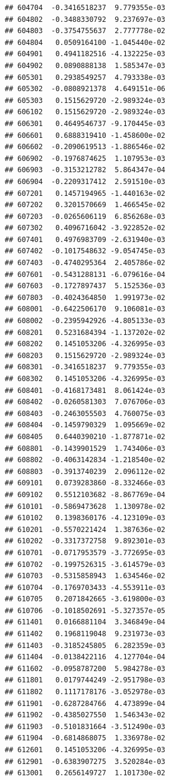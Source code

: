 \begin{frame}[fragile]
\begin{verbatim}
## 604704  -0.3416518237  9.779355e-03
## 604802  -0.3488330792  9.237697e-03
## 604803  -0.3754755637  2.777778e-02
## 604804   0.0509164100 -1.045440e-02
## 604901   0.4941182516 -4.132225e-03
## 604902   0.0890888138  1.585347e-03
## 605301   0.2938549257  4.793338e-03
## 605302  -0.0808921378  4.649151e-06
## 605303   0.1515629720 -2.989324e-03
## 606102   0.1515629720 -2.989324e-03
## 606301   0.4649546737 -9.170445e-03
## 606601   0.6888319410 -1.458600e-02
## 606602  -0.2090619513 -1.886546e-02
## 606902  -0.1976874625  1.107953e-03
## 606903  -0.3153212782  5.864347e-04
## 606904  -0.2209317412  2.591510e-03
## 607201   0.1457194965 -1.440163e-02
## 607202   0.3201570669  1.466545e-02
## 607203  -0.0265606119  6.856268e-03
## 607302   0.4096716042 -3.922852e-02
## 607401   0.4976983709 -2.631940e-03
## 607402  -0.1017548632 -9.054745e-03
## 607403  -0.4740295364  2.405786e-02
## 607601  -0.5431288131 -6.079616e-04
## 607603  -0.1727897437  5.152536e-03
## 607803  -0.4024364850  1.991973e-02
## 608001  -0.6422506170  9.106081e-03
## 608002  -0.2395942926 -4.805133e-03
## 608201   0.5231684394 -1.137202e-02
## 608202   0.1451053206 -4.326995e-03
## 608203   0.1515629720 -2.989324e-03
## 608301  -0.3416518237  9.779355e-03
## 608302   0.1451053206 -4.326995e-03
## 608401  -0.4168173481  8.061424e-03
## 608402  -0.0260581303  7.076706e-03
## 608403  -0.2463055503  4.760075e-03
## 608404  -0.1459790329  1.095669e-02
## 608405   0.6440390210 -1.877871e-02
## 608801  -0.1439901529  1.743406e-03
## 608802  -0.4063142834 -1.218540e-02
## 608803  -0.3913740239  2.096112e-02
## 609101   0.0739283860 -8.332466e-03
## 609102   0.5512103682 -8.867769e-04
## 610101  -0.5869473628  1.130978e-02
## 610102   0.1398360176 -4.123109e-03
## 610201  -0.5570221424  1.387636e-02
## 610202  -0.3317372758  9.892301e-03
## 610701  -0.0717953579 -3.772695e-03
## 610702  -0.1997526315 -3.614579e-03
## 610703  -0.5315858943  1.634546e-02
## 610704  -0.1769703433 -4.553911e-03
## 610705   0.2071842665 -3.619800e-03
## 610706  -0.1018502691 -5.327357e-05
## 611401   0.0166881104  3.346849e-04
## 611402   0.1968119048  9.231973e-03
## 611403  -0.3185245805  6.282359e-03
## 611404  -0.0138422116  4.127704e-04
## 611602  -0.0958787200  5.984278e-03
## 611801   0.0179744249 -2.951798e-03
## 611802   0.1117178176 -3.052978e-03
## 611901  -0.6287284766  4.473899e-04
## 611902  -0.4385027550  1.546343e-02
## 611903  -0.5101831664 -3.512490e-03
## 611904  -0.6814868075  1.336978e-02
## 612601   0.1451053206 -4.326995e-03
## 612901  -0.6383907275  3.520284e-03
## 613001   0.2656149727  1.101730e-02

\end{verbatim}
\end{frame}
